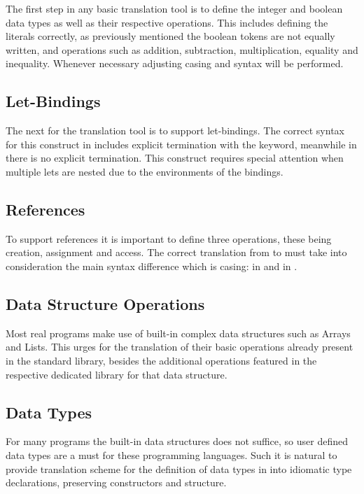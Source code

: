 The first step in any basic translation tool is to define the integer and boolean data types as well as their respective operations.
This includes defining the literals correctly, as previously mentioned the boolean tokens are not equally written, and operations
such as addition, subtraction, multiplication, equality and inequality. Whenever necessary adjusting casing and syntax will be performed.

\subsection{Let-Bindings}

The next for the translation tool is to support let-bindings. The correct syntax for this construct in \cml includes explicit 
termination with the  keyword, meanwhile in \ocaml there is no explicit termination. This construct requires 
special attention when multiple lets are nested due to the environments of the bindings.

\subsection{References}

To support references it is important to define three operations, these being creation, assignment and access. The correct translation
from \cml to \ocaml must take into consideration the main syntax difference which is casing:  in \ocaml
and  in \cml.

\subsection{Data Structure Operations}

Most real programs make use of built-in complex data structures such as Arrays and Lists. This urges for the translation of their 
basic operations already present in the standard library, besides the additional operations featured in the respective dedicated 
library for that data structure.

\subsection{Data Types}

For many programs the built-in data structures does not suffice, so user defined data types are a must for these programming languages.
Such it is natural to provide translation scheme for the definition of data types in \cml into idiomatic \ocaml type declarations, 
preserving constructors and structure.

